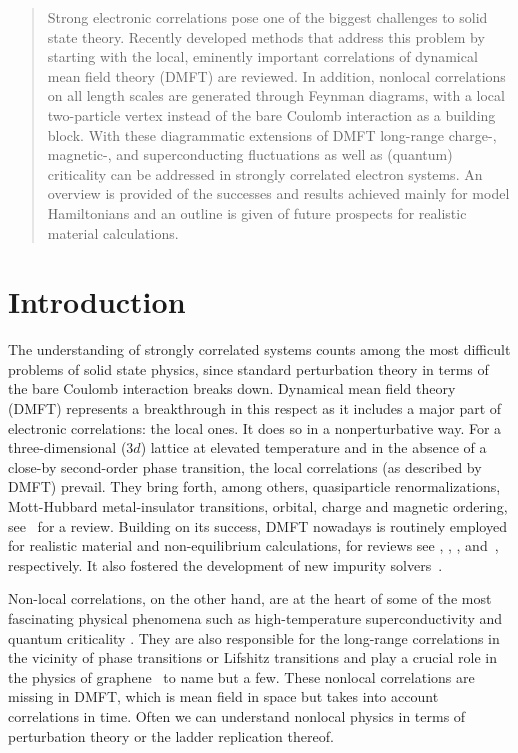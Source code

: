 \documentclass[rmp,aps,reprint,amsmath,amssymb,superscriptaddress,showpacs,nofootinbib]{revtex4-1}
\begin{document}
\begin{abstract}
Strong  electronic correlations pose one of the biggest challenges to solid state theory. Recently developed methods that address this problem by
starting with the local, eminently important correlations of dynamical mean field theory (DMFT) are reviewed. In addition, nonlocal correlations on all length scales are generated through Feynman diagrams, with  a local  two-particle vertex instead of the bare Coulomb interaction as a building block. With these diagrammatic extensions of DMFT long-range charge-, magnetic-, and superconducting fluctuations as well as (quantum) criticality can be addressed in strongly correlated electron systems. An overview is provided of the successes and results achieved mainly for model Hamiltonians and an outline is given of future prospects for realistic material calculations.
\end{abstract}

\maketitle
\tableofcontents{}

\section{Introduction}

The understanding of strongly correlated systems counts among the most difficult problems of solid state physics, since standard perturbation theory in terms of the bare Coulomb interaction breaks down. Dynamical mean field theory (DMFT) represents a breakthrough in this respect as it includes a major part of electronic correlations: the local ones. It does so in a nonperturbative way. For a three-dimensional ($3d$) lattice at elevated temperature and in the absence of a close-by second-order phase transition, the local correlations (as described by DMFT) prevail. They bring forth, among others, quasiparticle renormalizations, Mott-Hubbard metal-insulator transitions, orbital, charge and magnetic ordering, see~ for a review. Building on its success, DMFT nowadays is routinely employed for realistic material and non-equilibrium calculations, for reviews see , ,  ,  and~, respectively. It also fostered the development of  new impurity solvers~\cite{Bulla2008,Gull2011}.

Non-local correlations, on the other hand, are at the heart of some of the most fascinating physical phenomena such as high-temperature superconductivity \cite{Bednorz1986} and quantum criticality \cite{Loehneysen2007}. They are also responsible for the long-range correlations in the vicinity of phase transitions or Lifshitz transitions \cite{Lifshitz1960} and play a crucial role in the physics of graphene~\cite{Kutov2012} to name but a few. These nonlocal correlations are missing in DMFT, which is mean field in space but takes into account correlations in time. Often we can understand nonlocal physics in terms of perturbation theory or the ladder replication thereof. 
\end{document}
